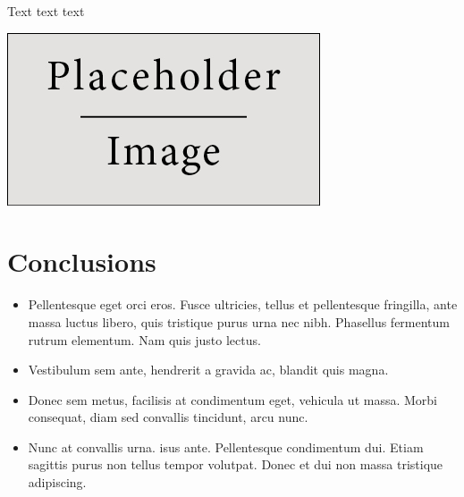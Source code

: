 \documentclass[a0,landscape]{a0poster}
\begin{document}
\begin{multicols}{3}
Text text text

\begin{center}\vspace{1cm}
\includegraphics[width=0.8\linewidth]{placeholder}
\end{center}\vspace{1cm}


\color{SaddleBrown} %

\section*{Conclusions}

\begin{itemize}
\item Pellentesque eget orci eros. Fusce ultricies, tellus et pellentesque fringilla, ante massa luctus libero, quis tristique purus urna nec nibh. Phasellus fermentum rutrum elementum. Nam quis justo lectus.
\item Vestibulum sem ante, hendrerit a gravida ac, blandit quis magna.
\item Donec sem metus, facilisis at condimentum eget, vehicula ut massa. Morbi consequat, diam sed convallis tincidunt, arcu nunc.
\item Nunc at convallis urna. isus ante. Pellentesque condimentum dui. Etiam sagittis purus non tellus tempor volutpat. Donec et dui non massa tristique adipiscing.
\end{itemize}

\color{DarkSlateGray} %



\end{multicols}
\end{document}
